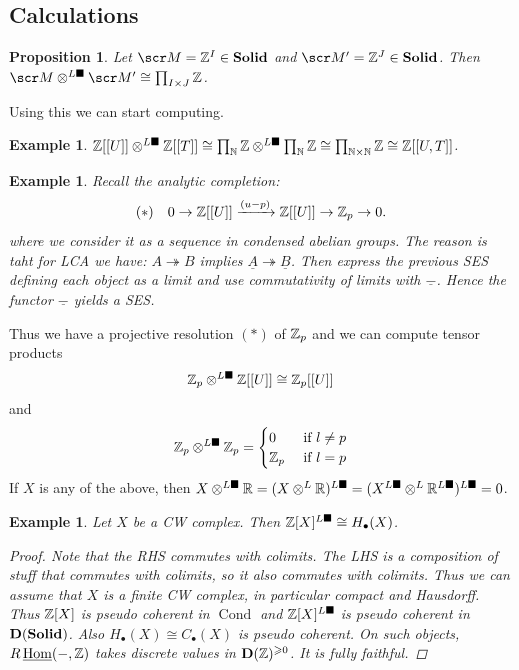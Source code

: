 \documentclass[A4paper, british, reqno]{amsart}
\theoremstyle{darkgreentheorem}
\newtheorem{prop}[thm]{Proposition}
\theoremstyle{darkbluedefinition}
\theoremstyle{darkredexample}
\newtheorem{exa}[thm]{Example}
\theoremstyle{remark}
\DeclareMathOperator{\Cond}{Cond}
\DeclareMathOperator{\ihom}{\underline{Hom}}
\newcommand{\Solid}{\mathbf{Solid}}
\newcommand{\1}{\mathbbm{1}}
\renewcommand{\u}[1]{\underline{#1}}
\newcommand{\ot}{\otimes}
\newcommand{\tms}{\times}
\newcommand{\epi}{\twoheadrightarrow}
\newcommand{\dsolid}{^{L\blacksquare}}
\begin{document}
\subsection{Calculations}

\begin{prop}
    Let $\M=\Z^{I}\in \Solid$ and $\M'=\Z^{J}\in \Solid$.
    Then $\M\ot\dsolid \M'\cong \prod_{I\tms J} \Z $.
\end{prop}

Using this we can start computing.

\begin{exa}
    $\Z[[U]]\ot\dsolid \Z[[T]]\cong \prod_{\N}\Z\ot\dsolid \prod_{\N}\Z \cong \prod_{\N\tms\N}\Z\cong \Z[[U,T]]$.
\end{exa}

\begin{exa}
    Recall the analytic completion:
    \[ (*) \quad 0\to \mathbb{Z}[[U]]\xrightarrow{(u-p)}\mathbb{Z}[[U]]\to \mathbb{Z}_{p}\to 0.\]
    where we consider it as a sequence in condensed abelian groups.
    The reason is taht for LCA we have: $A\epi B$ implies $\u{A}\epi \u{B}$.
    Then express the previous SES defining each object as a limit and use commutativity of limits with $\u{-}$.
    Hence the functor $\u{-}$ yields a SES.
\end{exa}

Thus we have a projective resolution $(*)$ of $\mathbb{Z}_{p}$ and we can compute tensor products
\[ \Z_{p}\ot\dsolid \Z[[U]] \cong \Z_{p}[[U]] \]
and
\[ \Z_{p}\ot \dsolid \Z_{p}=\begin{cases} 0 &\text{ if } l\neq p \\ \Z_{p} & \text{ if } l=p\end{cases} \]
If $X$ is any of the above, then $X\ot\dsolid \R=(X\ot^{L}\R)\dsolid=(X\dsolid\ot^{L}\R\dsolid)\dsolid=0$.

\begin{exa}
    Let $X$ be a CW complex.
    Then $\Z[X]\dsolid \cong H_{\bullet}(X)$.
    \begin{proof}
	Note that the RHS commutes with colimits.
	The LHS is a composition of stuff that commutes with colimits, so it also commutes with colimits.
	Thus we can assume that $X$ is a finite CW complex, in particular compact and Hausdorff.
	Thus $\mathbb{Z}[X]$ is pseudo coherent in $\Cond$ and $\Z[X]\dsolid$ is pseudo coherent in $\D(\Solid)$.
	Also $H_{\bullet}(X)\cong C_{\bullet}(X)$ is pseudo coherent.
	On such objects, $R\ihom(-,\Z)$ takes discrete values in $\mathbf{D}(\mathbb{Z})^{\geqslant 0}$.
	It is fully faithful.
    \end{proof}
\end{exa}
\end{document}
